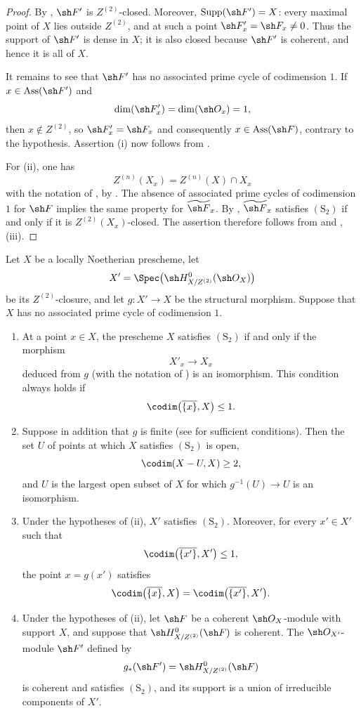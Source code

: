 \begin{proof}
By , $\sh F'$ is $Z^{(2)}$-closed.  Moreover,
$\operatorname{Supp}(\sh F')=X$: every maximal point of $X$
lies outside $Z^{(2)}$, and at such a point
$\sh F'_x=\sh F_x\neq0$.  Thus the support of $\sh F'$ is dense
in $X$; it is also closed because $\sh F'$ is coherent, and
hence it is all of $X$.

It remains to see that $\sh F'$ has no associated prime cycle of
codimension $1$.  If $x\in\operatorname{Ass}(\sh F')$ and
\[
  \dim(\sh F'_x)=\dim(\sh O_x)=1,
\]
then $x\notin Z^{(2)}$, so $\sh F'_x=\sh F_x$ and consequently
$x\in\operatorname{Ass}(\sh F)$, contrary to the hypothesis.
Assertion {\rm(i)} now follows from .

For {\rm(ii)}, one has
\[
  Z^{(n)}(X_x)=Z^{(n)}(X)\cap X_x
\]
with the notation of , by .
The absence of associated prime cycles of codimension $1$ for
$\sh F$ implies the same property for
$\widetilde{\sh F}_x$.  By ,
$\widetilde{\sh F}_x$ satisfies $(\mathrm S_2)$ if and only if
it is $Z^{(2)}(X_x)$-closed.  The assertion therefore follows
from  and , {\rm(iii)}.
\end{proof}

\begin{proposition}[5.10.16]
\label{IV.5.10.16}
Let $X$ be a locally Noetherian prescheme, let
\[
  X'=\Spec\bigl(\sh H^0_{X/Z^{(2)}}(\sh O_X)\bigr)
\]
be its $Z^{(2)}$-closure, and let $g:X'\to X$ be the structural
morphism.  Suppose that $X$ has no associated prime cycle of
codimension $1$.
\begin{enumerate}[{\rm(i)}]
  \item At a point $x\in X$, the prescheme $X$ satisfies
  $(\mathrm S_2)$ if and only if the morphism
  \[
    X'_x\longrightarrow X_x
  \]
  deduced from $g$ (with the notation of ) is
  an isomorphism.  This condition always holds if
  \[
    \codim\bigl(\overline{\{x\}},X\bigr)\leq1.
  \]
  \item Suppose in addition that $g$ is finite (see
   for sufficient conditions).  Then the set
  $U$ of points at which $X$ satisfies $(\mathrm S_2)$ is open,
  \[
    \codim(X-U,X)\geq2,
  \]
  and $U$ is the largest open subset of $X$ for which
  $g^{-1}(U)\to U$ is an isomorphism.
  \item Under the hypotheses of {\rm(ii)}, $X'$ satisfies
  $(\mathrm S_2)$.  Moreover, for every $x'\in X'$ such that
  \[
    \codim\bigl(\overline{\{x'\}},X'\bigr)\leq1,
  \]
  the point $x=g(x')$ satisfies
  \[
    \codim\bigl(\overline{\{x\}},X\bigr)
    =
    \codim\bigl(\overline{\{x'\}},X'\bigr).
  \]
  \item Under the hypotheses of {\rm(ii)}, let $\sh F$ be a
  coherent $\sh O_X$-module with support $X$, and suppose that
  $\sh H^0_{X/Z^{(2)}}(\sh F)$ is coherent.  The
  $\sh O_{X'}$-module $\sh F'$ defined by
  \[
    g_*(\sh F')=\sh H^0_{X/Z^{(2)}}(\sh F)
  \]
  is coherent and satisfies $(\mathrm S_2)$, and its support is
  a union of irreducible components of $X'$.
\end{enumerate}
\end{proposition}

